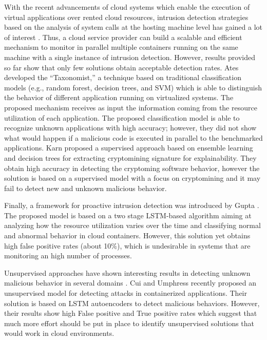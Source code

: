 With the recent advancements of cloud systems which enable the execution of virtual applications over rented cloud resources, intrusion detection strategies based on the analysis of system calls at the hosting machine level has gained a lot of interest \cite{ates2018taxonomist,karn2020cryptomining}. 
Thus, a cloud service provider can build a scalable and efficient mechanism to monitor in parallel multiple containers running on the same machine with a single instance of intrusion detection. However, results provided so far show that only few solutions obtain acceptable detection rates.
Ates \etal{} \cite{ates2018taxonomist} developed the ``Taxonomist,'' a technique based on traditional classification models (e.g., random forest, decision trees, and SVM) which is able to distinguish the behavior of different application running on virtualized systems. The proposed mechanism receives as input the information coming from the resource utilization of each application. The proposed classification model is able to recognize unknown applications with high accuracy; however, they did not show what would happen if a malicious code is executed in parallel to the benchmarked applications.
Karn \etal{} \cite{karn2020cryptomining} proposed a supervised approach based on ensemble learning and decision trees for extracting cryptomining signature for explainability. They obtain high accuracy in detecting the cryptoming software behavior, however the solution is based on a supervised model with a focus on cryptomining and it may fail to detect new and unknown malicious behavior.

Finally, a framework for proactive intrusion detection was introduced by Gupta \etal{} \cite{gupta2017supervised}. The proposed model is based on a two stage LSTM-based algorithm aiming at analyzing how the resource utilization varies over the time and classifying normal and abnormal behavior in cloud containers. However, this solution yet obtains high false positive rates (about 10\%), which is undesirable in systems that are monitoring an high number of processes.

Unsupervised approaches have shown interesting results in detecting unknown malicious behavior in several domains \cite{casas2012unsupervised,zhang2006anomaly,zoppi2021unsupervised}. Cui and Umphress \cite{cui2020towards} recently proposed an unsupervised model for detecting attacks in containerized applications. Their solution is based on LSTM autoencoders to detect malicious behaviors. However, their results show high False positive and True positive rates which suggest that much more effort should be put in place to identify unsupervised solutions that would work in cloud environments.
